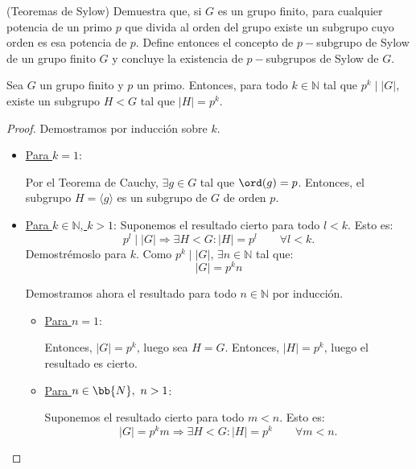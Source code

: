 \newpage
\begin{ejercicio}
    (Teoremas de Sylow) Demuestra que, si \(G\) es un grupo finito, para cualquier potencia de un primo \(p\) que divida al orden del grupo existe un subgrupo cuyo orden es esa potencia de \(p\). Define entonces el concepto de \(p-\)subgrupo de Sylow de un grupo finito \(G\) y concluye la existencia de \(p-\)subgrupos de Sylow de \(G\).

    \begin{teo}
        Sea $G$ un grupo finito y \(p\) un primo. Entonces, para todo $k\in \mathbb{N}$ tal que \(p^k\mid |G|\), existe un subgrupo \(H<G\) tal que \(|H| = p^k\).

        
        \begin{proof}
            Demostramos por inducción sobre \(k\).
            \begin{itemize}
                \item \ul{Para $k=1$}:
                
                Por el Teorema de Cauchy, $\exists g\in G$ tal que \(\ord(g) = p\). Entonces, el subgrupo \(H = \langle g\rangle\) es un subgrupo de \(G\) de orden \(p\).

                \item \ul{Para $k\in \mathbb{N}$, $k>1$}: Suponemos el resultado cierto para todo $l<k$. Esto es:
                \begin{equation*}
                    p^l\mid |G| \Longrightarrow \exists H<G: |H| = p^l \qquad \forall l<k.
                \end{equation*}
                Demostrémoslo para \(k\). Como \(p^k\mid |G|\), $\exists n\in \mathbb{N}$ tal que:
                \begin{equation*}
                    |G| = p^k n
                \end{equation*}

                Demostramos ahora el resultado para todo $n\in \mathbb{N}$ por inducción.
                \begin{itemize}
                    \item \ul{Para $n=1$}:
                    
                    Entonces, $|G|=p^k$, luego sea $H=G$. Entonces, \(|H| = p^k\), luego el resultado es cierto.

                    \item \ul{Para $n\in \bb{N},\ n>1$}:
                    
                    Suponemos el resultado cierto para todo $m<n$. Esto es:
                    \begin{equation*}
                        |G| = p^k m \Longrightarrow \exists H<G: |H| = p^k \qquad \forall m<n.
                    \end{equation*}


\end{itemize}
\end{itemize}
\end{proof}
\end{teo}
\end{ejercicio}
